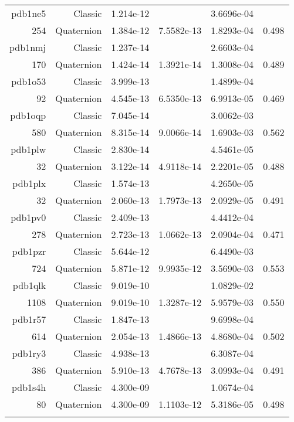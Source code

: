 \begin{xltabular}{\textwidth}{r|rS[table-format=1.3e+2]S[table-format=1.4e+2]S[table-format=1.4e+2]S[table-format=-1.3]}
pdb1ne5 & Classic & 1.214e-12 &  & 3.6696e-04 & \\
254 & Quaternion & 1.384e-12 & 7.5582e-13 & 1.8293e-04 & 0.498\\  \addlinespace
pdb1nmj & Classic & 1.237e-14 &  & 2.6603e-04 & \\
170 & Quaternion & 1.424e-14 & 1.3921e-14 & 1.3008e-04 & 0.489\\  \addlinespace
pdb1o53 & Classic & 3.999e-13 &  & 1.4899e-04 & \\
92 & Quaternion & 4.545e-13 & 6.5350e-13 & 6.9913e-05 & 0.469\\  \addlinespace
{\color{red} pdb1oqp } & Classic & 7.045e-14 &  & 3.0062e-03 & \\
580 & Quaternion & 8.315e-14 & 9.0066e-14 & 1.6903e-03 & 0.562\\  \addlinespace
pdb1plw & Classic & 2.830e-14 &  & 4.5461e-05 & \\
32 & Quaternion & 3.122e-14 & 4.9118e-14 & 2.2201e-05 & 0.488\\  \addlinespace
pdb1plx & Classic & 1.574e-13 &  & 4.2650e-05 & \\
32 & Quaternion & 2.060e-13 & 1.7973e-13 & 2.0929e-05 & 0.491\\  \addlinespace
pdb1pv0 & Classic & 2.409e-13 &  & 4.4412e-04 & \\
278 & Quaternion & 2.723e-13 & 1.0662e-13 & 2.0904e-04 & 0.471\\  \addlinespace
{\color{red} pdb1pzr } & Classic & 5.644e-12 &  & 6.4490e-03 & \\
724 & Quaternion & 5.871e-12 & 9.9935e-12 & 3.5690e-03 & 0.553\\  \addlinespace
{\color{red} pdb1qlk } & Classic & 9.019e-10 &  & 1.0829e-02 & \\
1108 & Quaternion & 9.019e-10 & 1.3287e-12 & 5.9579e-03 & 0.550\\  \addlinespace
pdb1r57 & Classic & 1.847e-13 &  & 9.6998e-04 & \\
614 & Quaternion & 2.054e-13 & 1.4866e-13 & 4.8680e-04 & 0.502\\  \addlinespace
pdb1ry3 & Classic & 4.938e-13 &  & 6.3087e-04 & \\
386 & Quaternion & 5.910e-13 & 4.7678e-13 & 3.0993e-04 & 0.491\\  \addlinespace
pdb1s4h & Classic & 4.300e-09 &  & 1.0674e-04 & \\
80 & Quaternion & 4.300e-09 & 1.1103e-12 & 5.3186e-05 & 0.498\\  \addlinespace

\end{xltabular}
